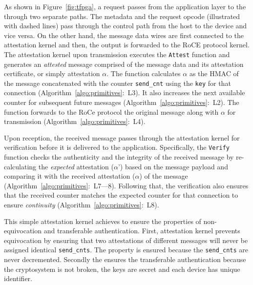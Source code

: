 As shown in Figure~\ref{fig:tfpga}, a request passes from the application layer to the \projecttitle{} through two separate paths. The metadata and the request opcode (illustrated with dashed lines) pass through the control path from the host to the device and vice versa. On the other hand, the message data wires are first connected to the attestation kernel and then, the output is forwarded to the RoCE protocol kernel. The attestation kernel upon transmission executes the \texttt{Attest} function and generates an {\em attested} message comprised of the message data and its attestation certificate, or simply attestation $\alpha$. The function calculates $\alpha$ as the HMAC of the message concatenated with the counter {\tt send\_cnt} using the {\tt key} for that connection (Algorithm~\ref{algo:primitives}:~L3). It also increases the next available counter for subsequent future messages (Algorithm~\ref{algo:primitives}:~L2). The function forwards to the RoCe protocol the original message along with $\alpha$ for transmission (Algorithm~\ref{algo:primitives}:~L4).


Upon reception, the received message passes through the attestation kernel for verification before it is delivered to the application. Specifically, the \texttt{Verify} function checks the authenticity and the integrity of the received message by re-calculating the {\em expected} attestation ($\alpha$') based on the message payload and comparing it with the received attestation ($\alpha$) of the message (Algorithm~\ref{algo:primitives}:~L7---8). Following that, the verification also ensures that the received counter matches the expected counter for that connection to ensure \emph{continuity} (Algorithm~\ref{algo:primitives}:~L8). 

 This simple attestation kernel achieves to ensure the properties of non-equivocation and transferable authentication. First, \projecttitle{} attestation kernel prevents equivocation by ensuring that two attestations of different messages
will never be assigned identical {\tt send\_cnts}. The property is ensured because the {\tt send\_cnts} are never decremented. Secondly the \projecttitle{} ensures the transferable authentication because the cryptosystem is not broken, the keys are secret and each \projecttitle{} device has unique identifier.


